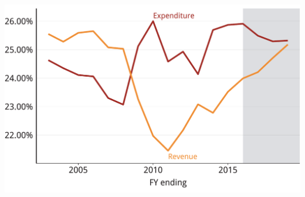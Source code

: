 \documentclass[tikz]{standalone}\usepackage[]{graphicx}\usepackage[]{color}
\newenvironment{knitrout}{}{} %
\begin{document}
\begin{knitrout}
\color{fgcolor}
\includegraphics[width=11.000in,height=7.00in]{./b5-figure/FISCAL-Figure2-1} 

\end{knitrout}
\end{document}
